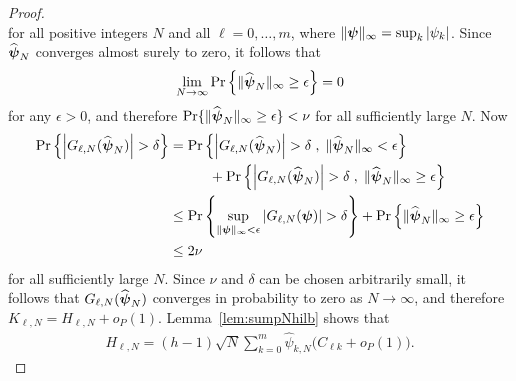 \documentclass[aap]{imsart}
\newcommand{\prob}{\operatorname{Pr}}
\newcommand{\abs}[1]{\left\vert #1 \right\vert}
\begin{document}
\begin{proof}
\[\]
for all positive integers $N$ and all $\ell = 0,\dots,m$, where $\|\psibf\|_\infty = \sup_{k} \abs{\psi_k}$.  Since $\widehat{\boldsymbol{\psi}}_N$ converges almost surely to zero, it follows that 
\[
\lim_{N\rightarrow\infty}\prob\left\{ \|\widehat{\psibf}_N\|_{\infty} \geq \epsilon \right\} = 0
\]
for any $\epsilon > 0$, and therefore $\prob\{ \|\widehat{\psibf}_N\|_{\infty} \geq \epsilon \} < \nu$ for all sufficiently large $N$.  Now
\begin{align*}
  \prob\left\{\abs{ G_{\ell,N}(\widehat{\psibf}_N) } > \delta \right\} &= \prob\left\{ \abs{G_{\ell,N}(\widehat{\psibf}_N)} > \delta \;, \; \|\widehat{\psibf}_N\|_{\infty} < \epsilon \right\} \\
&\hspace{1cm} + \prob\left\{ \abs{G_{\ell,N}(\widehat{\psibf}_N)} > \delta  \;, \; \|\widehat{\psibf}_N\|_{\infty} \geq \epsilon \right\} \\
&\leq \prob\left\{  \sup_{\|\psibf\|_{\infty} < \epsilon} \abs{ G_{\ell,N}(\psibf) } > \delta \right\} + \prob\left\{ \|\widehat{\psibf}_N\|_{\infty} \geq \epsilon \right\} \\
&\leq 2\nu
\end{align*}
for all sufficiently large $N$.  Since $\nu$ and $\delta$ can be chosen arbitrarily small, it follows that $G_{\ell,N}(\widehat{\boldsymbol{\psi}}_N)$ converges in probability to zero as $N\rightarrow\infty$, and therefore $K_{\ell,N} = H_{\ell,N} + o_P(1)$.  Lemma~\ref{lem:sumpNhilb} shows that
\begin{align*}
H_{\ell,N} =  (h-1)\sqrt{N} \sum_{k=0}^{m}  \widehat{\psi}_{k,N} \big(C_{\ell k} + o_P(1)\big).
\end{align*}
\end{proof}
\end{document}
